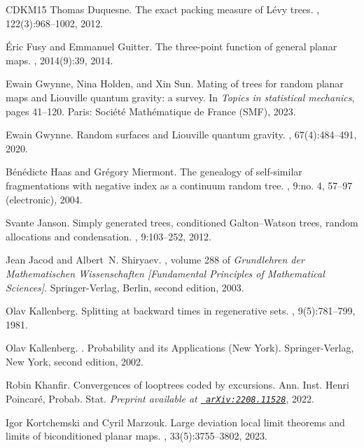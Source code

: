\documentclass[british, a4paper,11pt]{article}
\numberwithin{equation}{section}
\theoremstyle{definition}
\begin{document}
{\begin{thebibliography}{CDKM15}
Thomas Duquesne.
\newblock The exact packing measure of {L}\'evy trees.
, 122(3):968--1002, 2012.

\'{E}ric Fusy and Emmanuel Guitter.
\newblock The three-point function of general planar maps.
, 2014(9):39, 2014.

Ewain Gwynne, Nina Holden, and Xin Sun.
\newblock Mating of trees for random planar maps and {Liouville} quantum
  gravity: a survey.
\newblock In {\em Topics in statistical mechanics}, pages 41--120. Paris:
  Soci{\'e}t{\'e} Math{\'e}matique de France (SMF), 2023.

Ewain Gwynne.
\newblock Random surfaces and {Liouville} quantum gravity.
, 67(4):484--491, 2020.

B\'en\'edicte Haas and Gr{\'e}gory Miermont.
\newblock The genealogy of self-similar fragmentations with negative index as a
  continuum random tree.
, 9:no. 4, 57--97 (electronic), 2004.

Svante Janson.
\newblock Simply generated trees, conditioned {G}alton--{W}atson trees, random
  allocations and condensation.
, 9:103--252, 2012.

Jean Jacod and Albert~N. Shiryaev.
, volume 288 of {\em
  Grundlehren der Mathematischen Wissenschaften [Fundamental Principles of
  Mathematical Sciences]}.
\newblock Springer-Verlag, Berlin, second edition, 2003.

Olav Kallenberg.
\newblock Splitting at backward times in regenerative sets.
, 9(5):781--799, 1981.

Olav Kallenberg.
.
\newblock Probability and its Applications (New York). Springer-Verlag, New
  York, second edition, 2002.

Robin Khanfir.
\newblock Convergences of looptrees coded by excursions.
 Ann. Inst. Henri Poincar{\'e}, Probab. Stat. {\em
  Preprint available at \href{http://arxiv.org/abs/2208.11528}{\tt
  arXiv:2208.11528}}, 2022.

Igor Kortchemski and Cyril Marzouk.
\newblock Large deviation local limit theorems and limits of biconditioned
  planar maps.
, 33(5):3755--3802, 2023.


\end{thebibliography}}
\end{document}
